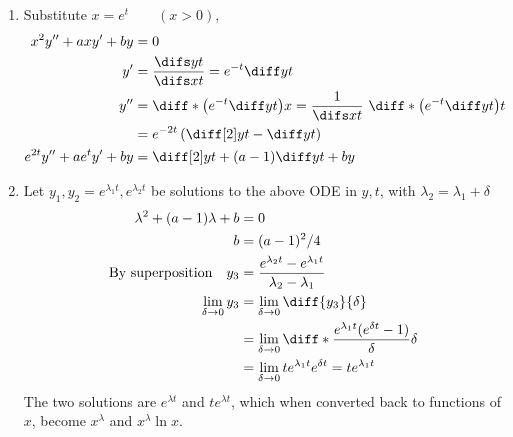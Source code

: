 \begin{enumerate}
\begin{enumerate}
              \item Substitute $ x = e^{t} \qquad (x>0)$,
                    \begin{align}
                        x^{2}y'' + axy' + by      & = 0                                                                                                         \\
                        y'                        & = \frac{\difs yt}{\difs xt} = e^{-t}\diff yt                                                                \\
                        y''                       & = \diff* {\left( e^{-t}\diff yt \right)}{x} = \frac{1}{\difs xt}\ \diff* {\left( e^{-t}\diff yt \right)}{t} \\
                                                  & = e^{-2t}\left(\diff[2] yt - \diff yt  \right)                                                              \\
                        e^{2t}y'' + ae^{t}y' + by & = \diff[2] yt + (a-1)\diff yt + by
                    \end{align}

              \item Let $y_{1}, y_{2} = e^{\lambda_{1} t}, e^{\lambda_{2} t}$ be solutions to the
                    above ODE in $ y, t $, with $ \lambda_{2} = \lambda_{1} + \delta $
                    \begin{align}
                        \lambda^{2} + (a-1)\lambda + b      & = 0                                                                                            \\
                        b                                   & = (a - 1)^{2} / 4                                                                              \\
                        \text{By superposition} \quad y_{3} & = \frac{e^{\lambda_{2} t} - e^{\lambda_{1} t}}{\lambda_{2} - \lambda_{1}}                      \\
                        \lim_{\delta \rightarrow 0}y_{3}    & = \lim_{\delta \rightarrow 0} \diff {y_{3}}{\delta}                                            \\
                                                            & =\lim_{\delta \rightarrow 0} \diff*{\frac{e^{\lambda_{1}t}(e^{\delta t} - 1)}{\delta}}{\delta} \\
                                                            & = \lim_{\delta \rightarrow 0} t e^{\lambda_{1}t}e^{\delta t} = te^{\lambda_{1}t}
                    \end{align}
                    The two solutions are $ e^{\lambda t} $ and $ te^{\lambda t} $, which when converted back to
                    functions of $ x $, become $ x^{\lambda} $ and $ x^{\lambda} \ln x $.
          \end{enumerate}
\end{enumerate}